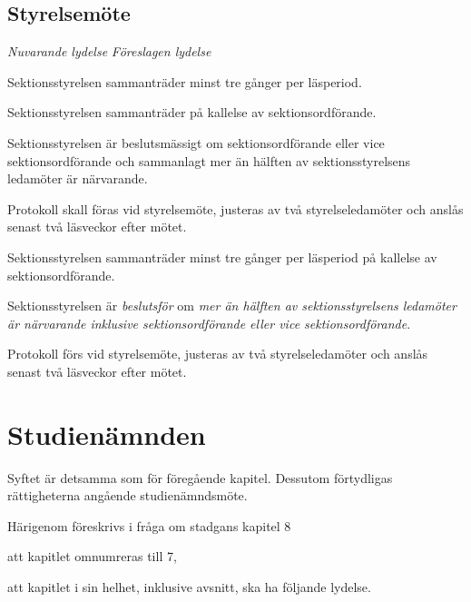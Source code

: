 \documentclass{article}
\newenvironment{lydelse}
    {\begin{paracol}{2}%
        \emph{Nuvarande lydelse}%
        \switchcolumn%
        \emph{Föreslagen lydelse}%
    \end{paracol}%
    \begin{enumerate}[label=\thesubsection.\arabic*]%
    \begin{paracol}{2}%
    }{\end{paracol}\end{enumerate}}
\begin{document}
\subsection{Styrelsemöte}
\begin{lydelse}
  \setcounter{section}{7}
  \setcounter{subsection}{5}
  \item Sektionsstyrelsen sammanträder minst tre gånger per läsperiod.
  \item Sektionsstyrelsen sammanträder på kallelse av sektionsordförande.
  \setcounter{subsection}{6}
  \setcounter{enumi}{0}
  \item Sektionsstyrelsen är beslutsmässigt om sektionsordförande eller vice sektionsordförande och sammanlagt mer än hälften av sektionsstyrelsens ledamöter är närvarande.
  \setcounter{subsection}{8}
  \setcounter{enumi}{0}
  \item Protokoll skall föras vid styrelsemöte, justeras av två
    styrelseledamöter och anslås senast två läsveckor efter mötet.
  \switchcolumn  

  \item Sektionsstyrelsen sammanträder minst tre gånger per läsperiod på kallelse av sektionsordförande.
  \item Sektionsstyrelsen är \emph{beslutsför} om \emph{mer än hälften av sektionsstyrelsens ledamöter är närvarande inklusive sektionsordförande eller vice sektionsordförande}.
  \item Protokoll förs vid styrelsemöte, justeras av två styrelseledamöter och anslås senast två läsveckor efter mötet.
\end{lydelse}
\setcounter{section}{6}
\setcounter{subsection}{2}

\section{Studienämnden}
Syftet är detsamma som för föregående kapitel.
Dessutom förtydligas rättigheterna angående studienämndsmöte.

Härigenom föreskrivs i fråga om stadgans kapitel 8
\begin{dels}
\item att kapitlet omnumreras till 7,
\item att kapitlet i sin helhet, inklusive avsnitt, ska ha följande lydelse.
\end{dels}
\end{document}
